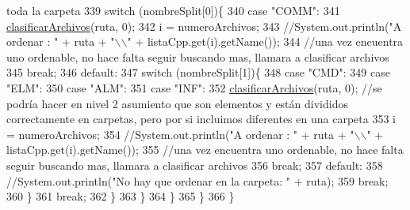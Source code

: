\begin{DoxyCode}
{       toda la carpeta}
339                     \textcolor{keywordflow}{switch} (nombreSplit[0])\{
340                         \textcolor{keywordflow}{case} \textcolor{stringliteral}{"COMM"}:
341                             \mbox{\hyperlink{classactualizadordoxy_1_1_actualizador_doxy_a552da974148de3397521e9ca911e5568}{clasificarArchivos}}(ruta, 0);
342                             i = numeroArchivos;
343                             \textcolor{comment}{//System.out.println("A ordenar : " + ruta + "\(\backslash\)\(\backslash\)" + listaCpp.get(i).getName());}
344                             \textcolor{comment}{//una vez encuentra uno ordenable, no hace falta seguir buscando mas, llamara a
       clasificar archivos}
345                             \textcolor{keywordflow}{break};
346                         \textcolor{keywordflow}{default}:
347                             \textcolor{keywordflow}{switch} (nombreSplit[1])\{
348                                 \textcolor{keywordflow}{case} \textcolor{stringliteral}{"CMD"}:
349                                 \textcolor{keywordflow}{case} \textcolor{stringliteral}{"ELM"}:
350                                 \textcolor{keywordflow}{case} \textcolor{stringliteral}{"ALM"}:
351                                 \textcolor{keywordflow}{case} \textcolor{stringliteral}{"INF"}:
352                                     \mbox{\hyperlink{classactualizadordoxy_1_1_actualizador_doxy_a552da974148de3397521e9ca911e5568}{clasificarArchivos}}(ruta, 0); \textcolor{comment}{//se podría hacer en
       nivel 2 asumiento que son elementos y están divididos correctamente en carpetas, pero por si incluimos
       diferentes en una carpeta}
353                                     i = numeroArchivos;                                    
354                                     \textcolor{comment}{//System.out.println("A ordenar : " + ruta + "\(\backslash\)\(\backslash\)" +
       listaCpp.get(i).getName());}
355                                     \textcolor{comment}{//una vez encuentra uno ordenable, no hace falta seguir buscando mas,
       llamara a clasificar archivos}
356                                     \textcolor{keywordflow}{break};
357                                 \textcolor{keywordflow}{default}:
358                                     \textcolor{comment}{//System.out.println("No hay que ordenar en la carpeta: " + ruta);}
359                                     \textcolor{keywordflow}{break};
360                             \}
361                             \textcolor{keywordflow}{break};
362                     \}
363                 \}
364             \}
365         \}
366     \}
\end{DoxyCode}
\mbox{\label{classactualizadordoxy_1_1_actualizador_doxy_a0a365e6e69bfc823f8ac8eea0e348c04}} 
